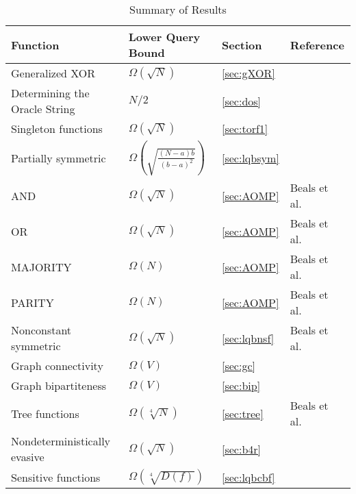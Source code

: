 \begin{table}
\begin{center}
\begin{tabular}{|l|l|l|l|}
\hline
Function & Lower Query Bound & Section & Reference \\ 
\hline
Generalized XOR & $\Omega\left(\sqrt{N}\right)$ & \ref{sec:gXOR} &  \\
\hline
Determining the Oracle String & $N/2$ & \ref{sec:dos} &  \\
\hline
Singleton functions & $\Omega\left(\sqrt{N}\right)$ & \ref{sec:torf1} & \\
\hline
Partially symmetric & $\Omega\left(\sqrt{\frac{(N-a)b}{(b-a)^{2}}}\right)$ & \ref{sec:lqbsym} &  \\
\hline
AND & $\Omega\left(\sqrt{N}\right)$ & \ref{sec:AOMP} & Beals et al.\ \cite{beals98quantum} \\
\hline
OR & $\Omega\left(\sqrt{N}\right)$ & \ref{sec:AOMP} & Beals et al.\ \cite{beals98quantum} \\
\hline
MAJORITY & $\Omega\left(N\right)$ & \ref{sec:AOMP} & Beals et al.\ \cite{beals98quantum} \\
\hline
PARITY & $\Omega\left(N\right)$ & \ref{sec:AOMP} & Beals et al.\ \cite{beals98quantum} \\
\hline
Nonconstant symmetric & $\Omega\left(\sqrt{N}\right)$ & \ref{sec:lqbnsf} & Beals et al.\ \cite{beals98quantum} \\
\hline
Graph connectivity & $\Omega\left(V\right)$ & \ref{sec:gc} & \\
\hline
Graph bipartiteness & $\Omega\left(V\right)$ & \ref{sec:bip} & \\
\hline
Tree functions & $\Omega\left(\sqrt[4]{N}\right)$ & \ref{sec:tree} & Beals et al.\ \cite{beals98quantum} \\
\hline
Nondeterministically evasive & $\Omega\left(\sqrt{N}\right)$ & \ref{sec:b4r} &  \\
\hline
Sensitive functions & $\Omega\left(\sqrt[4]{D(f)}\right)$ & \ref{sec:lqbcbf} & \\
\hline
\end{tabular}
\end{center}
\caption{Summary of Results \label{tbl:results}}
\end{table}
